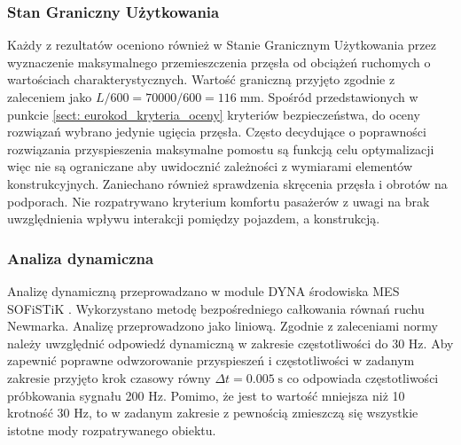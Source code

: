 \subsubsection{Stan Graniczny Użytkowania}
Każdy z rezultatów oceniono również w Stanie Granicznym Użytkowania przez wyznaczenie maksymalnego przemieszczenia przęsła od obciążeń ruchomych o wartościach charakterystycznych. Wartość graniczną przyjęto zgodnie z zaleceniem \cite{PKNc} jako $L/600=70000/600=116\;\text{mm}$. Spośród przedstawionych w punkcie \ref{sect: eurokod_kryteria_oceny} kryteriów bezpieczeństwa, do oceny rozwiązań wybrano jedynie ugięcia przęsła. Często decydujące o poprawności rozwiązania przyspieszenia maksymalne pomostu są funkcją celu optymalizacji więc nie są ograniczane aby uwidocznić zależności z wymiarami elementów konstrukcyjnych. Zaniechano również sprawdzenia skręcenia przęsła i obrotów na podporach. Nie rozpatrywano kryterium komfortu pasażerów z uwagi na brak uwzględnienia wpływu interakcji pomiędzy pojazdem, a konstrukcją.

\subsubsection{Analiza dynamiczna}
Analizę dynamiczną przeprowadzano w module DYNA środowiska MES SOFiSTiK \cite{SOFiSTiK2018a}. Wykorzystano metodę bezpośredniego całkowania równań ruchu Newmarka. Analizę przeprowadzono jako liniową. Zgodnie z zaleceniami normy \cite{PKNc} należy uwzględnić odpowiedź dynamiczną w zakresie częstotliwości do 30 Hz. Aby zapewnić poprawne odwzorowanie przyspieszeń i częstotliwości w zadanym zakresie przyjęto krok czasowy równy $\Delta t = 0.005\;\text{s}$ co odpowiada częstotliwości próbkowania sygnału 200 Hz. Pomimo, że jest to wartość mniejsza niż 10 krotność 30 Hz, to w zadanym zakresie z pewnością zmieszczą się wszystkie istotne mody rozpatrywanego obiektu.


